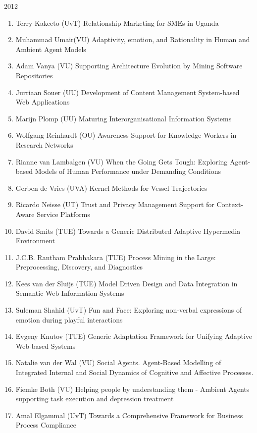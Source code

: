 \begin{multicols}{2}
\begin{scriptsize}
\vspace{0.2cm}
2012
\vspace{0.2cm}
\begin{enumerate}[leftmargin=*,noitemsep,topsep=0pt,parsep=1pt,partopsep=0pt]
\renewcommand{\labelenumi}{2012-\arabic{enumi}}
\item Terry Kakeeto (UvT) Relationship Marketing for SMEs in Uganda
\item Muhammad Umair(VU) Adaptivity, emotion, and Rationality in Human and Ambient Agent Models
\item Adam Vanya (VU) Supporting Architecture Evolution by Mining Software Repositories
\item Jurriaan Souer (UU) Development of Content Management System-based Web Applications
\item Marijn Plomp (UU) Maturing Interorganisational Information Systems
\item Wolfgang Reinhardt (OU) Awareness Support for Knowledge Workers in Research Networks
\item Rianne van Lambalgen (VU) When the Going Gets Tough: Exploring Agent-based Models of Human Performance under Demanding Conditions
\item Gerben de Vries (UVA) Kernel Methods for Vessel Trajectories
\item Ricardo Neisse (UT) Trust and Privacy Management Support for Context-Aware Service Platforms
\item David Smits (TUE) Towards a Generic Distributed Adaptive Hypermedia Environment
\item J.C.B. Rantham Prabhakara (TUE) Process Mining in the Large: Preprocessing, Discovery, and Diagnostics
\item Kees van der Sluijs (TUE) Model Driven Design and Data Integration in Semantic Web Information Systems
\item Suleman Shahid (UvT) Fun and Face: Exploring non-verbal expressions of emotion during playful interactions
\item Evgeny Knutov (TUE) Generic Adaptation Framework for Unifying Adaptive Web-based Systems
\item Natalie van der Wal (VU) Social Agents. Agent-Based Modelling of Integrated Internal and Social Dynamics of Cognitive and Affective Processes.
\item Fiemke Both (VU) Helping people by understanding them - Ambient Agents supporting task execution and depression treatment
\item Amal Elgammal (UvT) Towards a Comprehensive Framework for Business Process Compliance

\end{enumerate}
\end{scriptsize}
\end{multicols}
